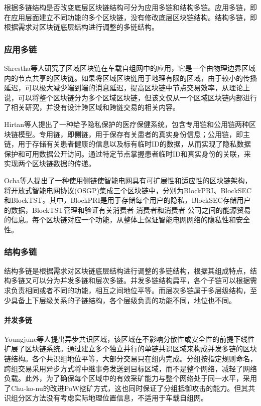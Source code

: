 根据多链结构是否改变底层区块链结构可分为应用多链和结构多链。应用多链，即在应用层面建立不同功能的多个区块链，没有修改底层区块链结构。结构多链，即根据需求对区块链底层结构进行调整的多链结构。
\subsubsection{应用多链}
Shrestha等人\cite{shrestha2019regional}研究了区域区块链在车载自组网中的应用，它是一个由物理边界区域内的节点共享的区块链。如果将区域区块链用于地理有限的区域，由于较小的传播延迟，可以极大减少端到端的消息延迟，提高区块链中节点交易效率，从理论上说，可以将整个区块链分为多个区域区块链，但该文仅从一个区域区块链内部进行了相关研究，并没有设计跨区域和跨链交易的相关内容。

Hirtan等人\cite{hirtan2019blockchain}提出了一种给予隐私保护的医疗保健系统，包含专用链和公用链两种区块链模型。专用链，即侧链，用于保存有关患者的真实身份信息；公用链，即主链，用于存储有关患者健康的信息以及标有临时ID的数据，从而实现了隐私数据保护和可用数据公开访问。通过特定节点掌握患者临时ID和真实身份的关联，来实现两个区块链数据的传递。

Ocha等人\cite{sestrem2020cost}提出了一种使用侧链使智能电网具有可扩展性和适应性的区块链架构，将开放式智能电网协议(OSGP)集成三个区块链中，分别为BlockPRI、BlockSEC和BlockTST。其中，BlockPRI是用于存储每个用户的隐私，BlockSEC存储用户的数据，BlockTST管理和验证有关消费者-消费者和消费者-公司之间的能源贸易的信息。每个区块链对应一个功能，从整体上保证智能电网网络的隐私性和安全性。

\subsubsection{结构多链}
结构多链是根据需求对区块链底层结构进行调整的多链结构，根据其组成特点，结构多链又可以分为并发多链和层次多链。并发多链结构扁平，各个子链可以根据需求负责相同或者不同的功能，相互之间地位平等。而层次多链属于多层级结构，至少具备上下层级关系的子链结构，各个层级负责的功能不同，地位也不同。
\paragraph{并发多链}
Youngjune等人\cite{parkmonoxide}提出异步共识区域，该区域在不影响分散性或安全性的前提下线性扩展了区块链系统。通过建立多个独立并行的单链共识区域来构成并发多链的区块链结构。各个共识组地位平等，大部分交易只在组内完成。分组按指定规则命名，跨组交易采用异步方式将中继事务发送到目标区域，而不是整个网络，减轻了网络负载。此外，为了确保每个区域中的有效采矿能力与整个网络处于同一水平，采用了Chu-ko-nu的改进PoW挖矿方式，这也同时保证了分组抵御攻击的能力。但其共识组分区方法没有考虑实际地理位置信息，不适用于车载自组网。

